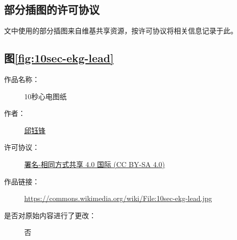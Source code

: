 \begin{appendix}

    \begingroup
    \renewcommand{\clearpage}{\relax}
    \listoftodos
    \endgroup

    \listoffigures
    \listoffigureEng


    \chapter*{部分插图的许可协议}\label{ch:license}

    文中使用的部分插图来自维基共享资源，按许可协议将相关信息记录于此。

    \section*{图\ref{fig:10sec-ekg-lead}}

    \begin{description}
        \item[作品名称：]10秒心电图纸
        \item[作者：]\href{https://zh.wikipedia.org/wiki/User:Kuyohong}{邱钰锋}
        \item[许可协议：]\href{https://creativecommons.org/licenses/by/4.0/}{署名-相同方式共享 4.0 国际 (CC BY-SA 4.0)}
        \item[作品链接：]\url{https://commons.wikimedia.org/wiki/File:10sec-ekg-lead.jpg}
        \item[是否对原始内容进行了更改：]否
    \end{description}

\end{appendix}
